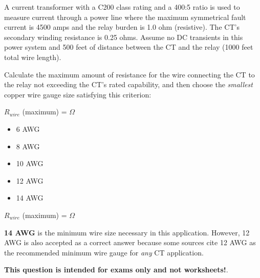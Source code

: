 

A current transformer with a C200 class rating and a 400:5 ratio is used to measure current through a power line where the maximum symmetrical fault current is 4500 amps and the relay burden is 1.0 ohm (resistive).  The CT's secondary winding resistance is 0.25 ohms.  Assume no DC transients in this power system and 500 feet of distance between the CT and the relay (1000 feet total wire length).

\vskip 10pt

Calculate the maximum amount of resistance for the wire connecting the CT to the relay not exceeding the CT's rated capability, and then choose the {\it smallest} copper wire gauge size satisfying this criterion:

\vskip 10pt

$R_{wire}$ (maximum) = \underbar{\hskip 50pt} $\Omega$

\vskip 10pt
\begin{itemize}
\item{} 6 AWG
\item{} 8 AWG
\item{} 10 AWG
\item{} 12 AWG
\item{} 14 AWG
\end{itemize}







$R_{wire}$ (maximum) =  $\Omega$

\vskip 10pt

{\bf 14 AWG} is the minimum wire size necessary in this application.  However, 12 AWG is also accepted as a correct answer because some sources cite 12 AWG as the recommended minimum wire gauge for {\it any} CT application.







{\bf This question is intended for exams only and not worksheets!}.



